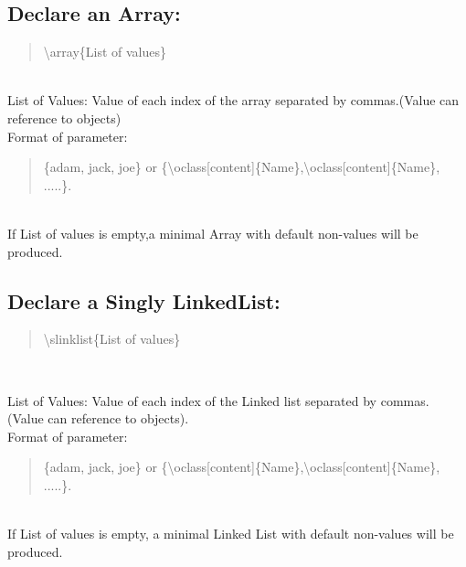 \documentclass[10pt,a4paper,english]{article}
\begin{document}
\begin{flushleft}
\subsection*{Declare an Array:}
\begin{quote}{\ttfamily \raggedright \noindent
{\textbackslash}array{\{}List of values{\}} 
}\end{quote}
~\\ \medskip
List of Values: Value of each index of the array separated by commas.(Value can reference to objects)
~\\ \medskip
Format of parameter:
~\\
\begin{quote}{\ttfamily \raggedright \noindent
{\{}adam, jack, joe{\}} or {\{}{\textbackslash}oclass[content]{\{}Name{\}},{\textbackslash}oclass[content]{\{}Name{\}}, .....{\}}. 
}\end{quote}
~\\
If List of values is empty,a minimal Array with default non-values will be produced.

\subsection*{Declare a Singly LinkedList:}
\begin{quote}{\ttfamily \raggedright \noindent
{\textbackslash}slinklist{{\{}List of values{\}} 
}}\end{quote}
~\\ \medskip

List of Values: Value of each index of the Linked list separated by commas. (Value can reference to objects). 
~\\ \medskip
Format of parameter:
~\\
\begin{quote}{\ttfamily \raggedright \noindent
{\{}adam, jack, joe{\}} or {\{}{\textbackslash}oclass[content]{\{}Name{\}},{\textbackslash}oclass[content]{\{}Name{\}}, .....{\}}. 
}\end{quote} ~\\
If List of values is empty, a minimal Linked List with default non-values will be produced.


\end{flushleft}
\end{document}
